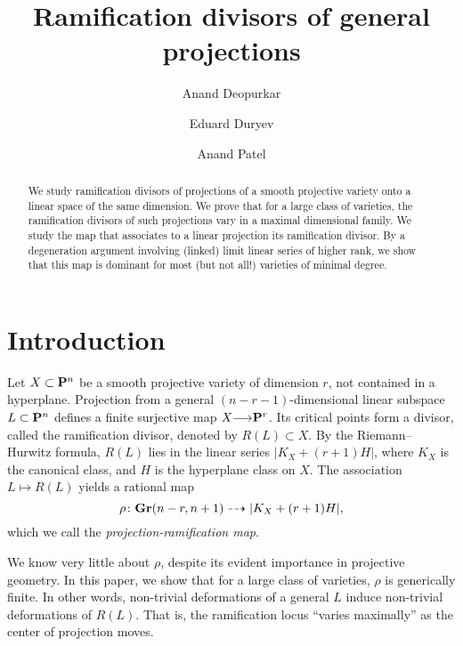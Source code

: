 \documentclass[11pt,reqno]{amsart}
\title[Projection and ramification]{Ramification divisors of general projections}
\author[Deopurkar]{Anand Deopurkar}
\author[Duryev]{Eduard Duryev}
\author[Patel]{Anand Patel}
\theoremstyle{plain}
\theoremstyle{definition}
\theoremstyle{remark}
\numberwithin{equation}{section}
\renewcommand{\to}{{\longrightarrow}}
\numberwithin{equation}{section}
\begin{document}
\begin{abstract}
  We study ramification divisors of projections of a smooth projective variety onto a linear space of the same dimension.
  We prove that for a large class of varieties, the ramification divisors of such projections vary in a maximal dimensional family.
  We study the map that associates to a linear projection its ramification divisor.
  By a degeneration argument involving (linked) limit linear series of higher rank, we show that this map is dominant for most (but not all!) varieties of minimal degree. 
\end{abstract}


\maketitle

\section{Introduction}\label{sec:intro}
Let $X \subset \P^n$ be a smooth projective variety of dimension $r$, not contained in a hyperplane.
Projection from a general $(n-r-1)$-dimensional linear subspace $L \subset \P^n$ defines a finite surjective map $X \to \P^r$.
Its critical points form a divisor, called the ramification divisor, denoted by $R(L) \subset X$.
By the Riemann--Hurwitz formula, $R(L)$ lies in the linear series $|K_X + (r+1)H|$, where $K_X$ is the canonical class, and $H$ is the hyperplane class on $X$.
The association $L \mapsto R(L)$ yields a rational map 
\[
  \rho \from \Gr(n-r, n+1) \dashrightarrow |K_X + (r+1)H|,
\]
which we call the \emph{projection-ramification map}.

We know very little about $\rho$, despite its evident importance in projective geometry.
In this paper, we show that for a large class of varieties, $\rho$ is generically finite.
In other words, non-trivial deformations of a general $L$ induce non-trivial deformations of $R(L)$.
That is, the ramification locus ``varies maximally'' as the center of projection moves.
\end{document}
